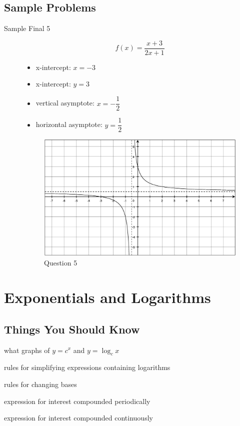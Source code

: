 \documentclass[fleqn,addpoints]{exam}
\begin{document}
\subsection{Sample Problems}
\begin{description}
\item[Sample Final 5]
\[
  f(x) = \frac{x+3}{2x+1}
\]

\begin{itemize}
  \item x-intercept: $x=-3$
  \item x-intercept: $y=3$
  \item vertical asymptote: $x = -\dfrac{1}{2}$
  \item horizontal asymptote: $y = \dfrac{1}{2}$
\end{itemize}

\begin{figure}[H]
  \centering
  \includegraphics[scale=.5]{final_5.eps}
  \caption*{Question 5}
\end{figure}

\end{description}

\section{Exponentials and Logarithms}
\subsection{Things You Should Know}
\begin{itemize*}
\item what graphs of $y=c^x$ and $y = \log_c x$ 
\item rules for simplifying expressions containing logarithms
\item rules for changing bases
\item expression for interest compounded periodically
\item expression for interest compounded continuously
\end{itemize*}
\end{document}
